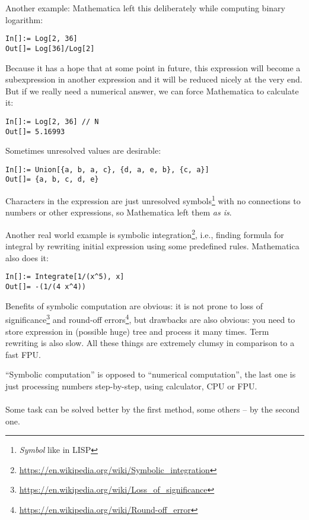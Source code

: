 Another example: Mathematica left this deliberately while computing binary logarithm:

\begin{lstlisting}
In[]:= Log[2, 36]
Out[]= Log[36]/Log[2]
\end{lstlisting}

Because it has a hope that at some point in future, this expression will become a subexpression in another expression and 
it will be reduced nicely at the very end.
But if we really need a numerical answer, we can force Mathematica to calculate it:

\begin{lstlisting}
In[]:= Log[2, 36] // N
Out[]= 5.16993
\end{lstlisting}

Sometimes unresolved values are desirable:

\begin{lstlisting}
In[]:= Union[{a, b, a, c}, {d, a, e, b}, {c, a}]
Out[]= {a, b, c, d, e}
\end{lstlisting}

Characters in the expression are just unresolved symbols\footnote{\textit{Symbol} like in LISP} with no connections to numbers or other expressions, 
so Mathematica left them \textit{as is}.

Another real world example is symbolic integration\footnote{\url{https://en.wikipedia.org/wiki/Symbolic_integration}}, 
i.e., finding formula for integral by rewriting initial expression using some predefined rules.
Mathematica also does it:

\begin{lstlisting}
In[]:= Integrate[1/(x^5), x]
Out[]= -(1/(4 x^4))
\end{lstlisting}

Benefits of symbolic computation are obvious: it is not prone to loss of significance\footnote{\url{https://en.wikipedia.org/wiki/Loss_of_significance}} and 
round-off errors\footnote{\url{https://en.wikipedia.org/wiki/Round-off_error}}, but drawbacks are also obvious: you need to store expression in (possible huge) tree
and process it many times.
Term rewriting is also slow.
All these things are extremely clumsy in comparison to a fast \ac{FPU}.

``Symbolic computation'' is opposed to ``numerical computation'', the last one is just processing numbers step-by-step, using calculator, \ac{CPU} or \ac{FPU}.\\
\\
Some task can be solved better by the first method, some others -- by the second one.

